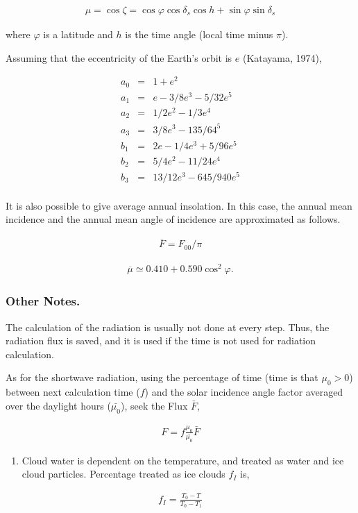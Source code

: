 \begin{eqnarray}
\mu = \cos \zeta = \cos \varphi \cos \delta_s \cos h
                 + \sin \varphi \sin \delta_s
\end{eqnarray}

where \(\varphi\) is a latitude and \(h\) is the time angle (local time minus
\(\pi\)).

Assuming that the eccentricity of the Earth's orbit is \(e\) (Katayama,
1974),

\begin{eqnarray}
   a_0 & = &  1 + e^2 \\
   a_1 & = &  e - 3/8 e^3 - 5/32 e^5 \\
   a_2 & = &  1/2 e^2 - 1/3e^4 \\
   a_3 & = &  3/8 e^3 - 135/64^5 \\
   b_1 & = & 2e - 1/4 e^3 + 5/96 e^5 \\
   b_2 & = & 5/4 e^2 - 11/24 e^4 \\
   b_3 & = & 13/12 e^3 - 645/940 e^5 \\
\end{eqnarray}

It is also possible to give average annual insolation. In this case, the
annual mean incidence and the annual mean angle of incidence are approximated 
as follows.

\begin{eqnarray}
\overline{F} = F_{00}/\pi
\end{eqnarray}

\begin{eqnarray}
\overline{\mu} \simeq 0.410 + 0.590 \cos^2 \varphi .
\end{eqnarray}

\hypertarget{other-notes.}{%
\subsubsection{Other Notes.}\label{other-notes.}}

The calculation of the radiation is usually not done at every step. 
Thus, the radiation flux is saved, and it is used if the time is not used for
radiation calculation. 

As for the shortwave radiation,
using the percentage of time (time is that \(\mu_0>0\)) between next calculation
time (\(f\)) and the solar incidence angle factor averaged over the daylight hours (\(\bar{\mu_0}\)),
seek the Flux \(\bar{F}\),

\begin{eqnarray}
        F =  f \frac{\mu_0}{\bar{\mu_0}} \bar{F}
\end{eqnarray}


\begin{enumerate}
\def\labelenumi{\arabic{enumi}.}
\setcounter{enumi}{1}
\tightlist
\item
  Cloud water is dependent on the temperature, and treated as water and ice cloud
  particles. Percentage treated as ice clouds \(f_I\) is,
\end{enumerate}

\begin{eqnarray}
        f_I = \frac{ T_0 - T }{ T_0 - T_1 }
\end{eqnarray}
